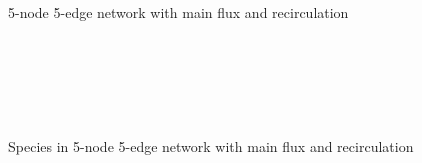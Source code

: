 \begin{figure}[htbp]
    \centering
    
    \caption{5-node 5-edge network with main flux and recirculation}
    \label{fig:recirculation_}
\end{figure}

\begin{figure}[htbp]
    \centering
    \begin{subfigure}[b]{0.48\textwidth}
        
        \caption{}
        \label{fig:recirculationCH4}
    \end{subfigure}
    ~
    \begin{subfigure}[b]{0.48\textwidth}
        
        \caption{}
        \label{fig:recirculationO2}
    \end{subfigure}
    ~
    \begin{subfigure}[b]{0.48\textwidth}
        
        \caption{}
        \label{fig:recirculationCO2}
    \end{subfigure}
    ~
    \begin{subfigure}[b]{0.48\textwidth}
        
        \caption{}
        \label{fig:recirculationH2O}
    \end{subfigure}
    \caption{Species in 5-node 5-edge network with main flux and recirculation}\label{fig:recirculation_species}
\end{figure}

